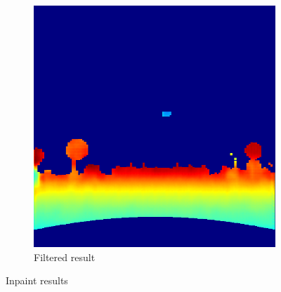 \documentclass[twoside]{ctuthesis}
\theoremstyle{plain}
\theoremstyle{definition}
\theoremstyle{note}
\begin{document}
\begin{figure}[h]
\begin{subfigure}[b]{0.3\textwidth}
		\includegraphics[width=\textwidth]{inpaint.png}
		\caption{Filtered result}
	\end{subfigure}
	\caption{Inpaint results}
\end{figure}
\end{document}
